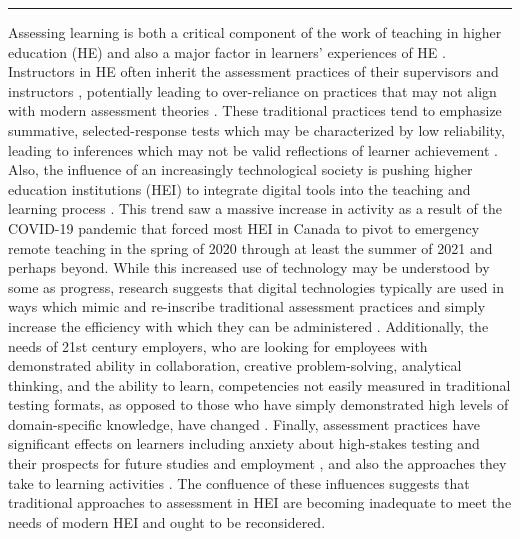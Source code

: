 \documentclass[
]{book}
\begin{document}
\begin{center}\rule{0.5\linewidth}{0.5pt}\end{center}

Assessing learning is both a critical component of the work of teaching in higher education (HE) and also a major factor in learners' experiences of HE \citep{biggsWhatStudentDoes1999, birenbaumAssessmentInstructionPreferences2007, woldeab21stCenturyAssessment2019}. Instructors in HE often inherit the assessment practices of their supervisors and instructors \citep{lipnevichWhatGradesMean2020}, potentially leading to over-reliance on practices that may not align with modern assessment theories \citep{boudChallengesReformingHigher2020, masseyAssessmentLiteracyCollege2020, shepardRoleAssessmentLearning2000}. These traditional practices tend to emphasize summative, selected-response tests \citep{floresPerceptionsEffectivenessFairness2015, harlenSystematicReviewImpact2002, lipnevichWhatGradesMean2020} which may be characterized by low reliability, leading to inferences which may not be valid reflections of learner achievement \citep{knightSummativeAssessmentHigher2002, smithglasgowStandardizedTestingNursing2019}. Also, the influence of an increasingly technological society is pushing higher education institutions (HEI) to integrate digital tools into the teaching and learning process \citep{pellegrinoPerspectivesIntegrationTechnology2010}. This trend saw a massive increase in activity as a result of the COVID-19 pandemic that forced most HEI in Canada to pivot to emergency remote teaching in the spring of 2020 through at least the summer of 2021 and perhaps beyond. While this increased use of technology may be understood by some as progress, research suggests that digital technologies typically are used in ways which mimic and re-inscribe traditional assessment practices and simply increase the efficiency with which they can be administered \citep{broadfootAssessmentTwentyFirstCenturyLearning2016}. Additionally, the needs of 21st century employers, who are looking for employees with demonstrated ability in collaboration, creative problem-solving, analytical thinking, and the ability to learn, competencies not easily measured in traditional testing formats, as opposed to those who have simply demonstrated high levels of domain-specific knowledge, have changed \citep{worldeconomicforumFutureJobsReport2020}. Finally, assessment practices have significant effects on learners including anxiety about high-stakes testing and their prospects for future studies and employment \citep{harlenSystematicReviewImpact2002}, and also the approaches they take to learning activities \citep{biggsTeachingQualityLearning2011, delucaDifferentialSituatedView2019}. The confluence of these influences suggests that traditional approaches to assessment in HEI are becoming inadequate to meet the needs of modern HEI and ought to be reconsidered.
\end{document}
